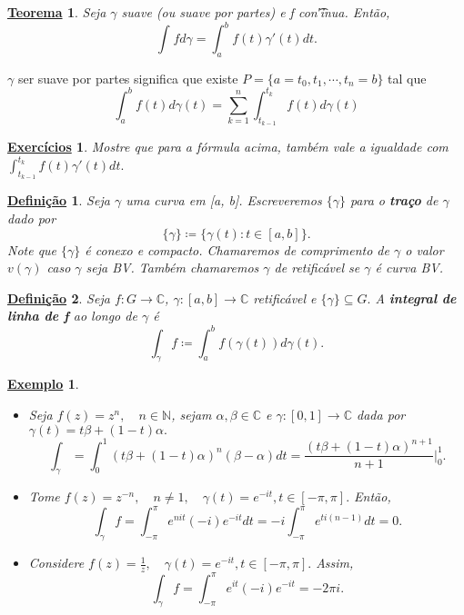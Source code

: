 \documentclass{article}
\newtheorem*{def*}{\underline{Defini\c c\~ao}}
\newtheorem*{theorem*}{\underline{Teorema}}
\newtheorem{example}{\underline{Exemplo}}[section]
\newtheorem*{exer*}{\underline{Exerc\'icios}}
\begin{document}
  \begin{theorem*}
    Seja $\gamma$ suave (ou suave por partes) e f con\t'inua. Ent\~ao, 
    $$
    \int_{}^{}f d \gamma = \int_{a}^{b}f(t)\gamma'(t)dt.
    $$
  \end{theorem*}
  $\gamma$ ser suave por partes significa que existe $P =\{a=t_{0}, t_1, \cdots, t_{n} = b\} $ tal que 
  $$
  \int_{a}^{b}f(t)d\gamma(t) = \sum\limits_{k=1}^{n}\int_{t_{k-1}}^{t_{k}}f(t)d\gamma(t)
  $$
  \begin{exer*}
    Mostre que para a f\'ormula acima, tamb\'em vale a igualdade com $\int_{t_{k-1}}^{t_{k}}f(t)\gamma'(t)dt.$
  \end{exer*}
  \begin{def*}
    Seja $\gamma$ uma curva em [a, b]. Escreveremos $\{\gamma\} $ para o \textbf{tra\c co} de $\gamma$ dado por 
    $$
    \{\gamma\}\coloneqq  \{\gamma(t): t\in{[a, b]}\}.
    $$
    Note que $\{\gamma\} $ \'e conexo e compacto. Chamaremos de comprimento de $\gamma$ o valor $v(\gamma)$ caso $\gamma$ seja BV.
    Tamb\'em chamaremos $\gamma$ de retific\'avel se $\gamma$ \'e curva BV.
  \end{def*}
  \begin{def*}
    Seja $f:G\rightarrow \mathbb{C}$, $\gamma:[a, b]\rightarrow \mathbb{C}$ retific\'avel e $\{\gamma\}\subseteq{G}.$ A \textbf{integral de 
    linha de f} ao longo de $\gamma$ \'e 
    $$
    \int_{\gamma}^{}f \coloneqq  \int_{a}^{b}f(\gamma(t))d\gamma(t).
    $$
  \end{def*}
  \begin{example}
    \begin{itemize}
      \item[i)] Seja $f(z) = z^n, \quad n\in{\mathbb{N}}$, sejam $\alpha, \beta\in \mathbb{C}$ e $\gamma:[0, 1]\rightarrow \mathbb{C}$
        dada por $\gamma(t) = t \beta + (1-t)\alpha.$
        $$
        \int_{\gamma}^{}=\int_{0}^{1}(t\beta + (1-t)\alpha)^n(\beta - \alpha)dt = \frac{(t\beta + (1-t)\alpha)^{n+1}}{n+1}\biggl|_0^1\biggr.
        $$
      \item[ii)] Tome $f(z) = z^{-n}, \quad n\neq1, \quad \gamma(t) = e^{-it}, t\in[-\pi, \pi].$ Ent\~ao,
        $$
        \int_{\gamma}^{}f = \int_{-\pi}^{\pi}e^{nit}(-i)e^{-it}dt = -i \int_{-\pi}^{\pi}e^{ti(n-1)}dt = 0.
        $$
      \item[iii)] Considere $f(z) = \frac{1}{z}, \quad \gamma(t) = e^{-it}, t\in[-\pi, \pi].$ Assim, 
        $$
        \int_{\gamma}^{}f = \int_{-\pi}^{\pi}e^{it}(-i)e^{-it} = -2\pi i.
        $$
    \end{itemize}
  \end{example}
\end{document}
